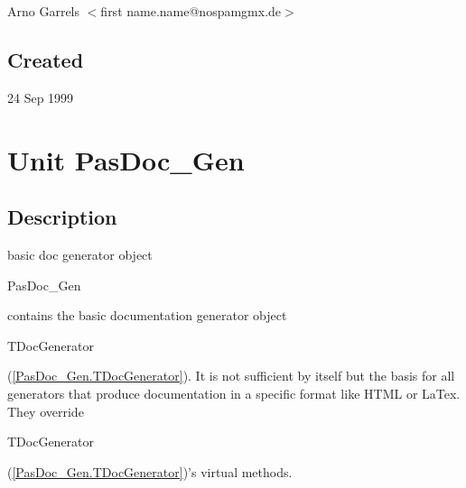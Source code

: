 \documentclass{report}
\begin{document}
\par
Arno Garrels {$<$}first name.name@nospamgmx.de{$>$}

\section{Created}
\par
24 Sep 1999


\chapter{Unit PasDoc{\_}Gen}
\label{PasDoc_Gen}
\section{Description}
basic doc generator object\hfill\vspace*{1ex}

             

\begin{ttfamily}PasDoc{\_}Gen\end{ttfamily} contains the basic documentation generator object \begin{ttfamily}TDocGenerator\end{ttfamily}(\ref{PasDoc_Gen.TDocGenerator}). It is not sufficient by itself but the basis for all generators that produce documentation in a specific format like HTML or LaTex. They override \begin{ttfamily}TDocGenerator\end{ttfamily}(\ref{PasDoc_Gen.TDocGenerator})'s virtual methods.
\end{document}
